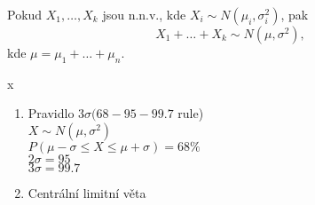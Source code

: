 \documentclass[../main.tex]{subfiles}
\begin{document}
\begin{remark}
    Pokud $X_1,\dots,X_k$ jsou n.n.v., kde $X_i \sim N(\mu_i, \sigma^2_i)$, pak
    \[X_1 + \dots + X_k \sim N(\mu, \sigma^2),\]
    kde $\mu = \mu_1 + \hdots + \mu_n$.
\end{remark}

\begin{remark}
    {\color{white} x}

    \begin{enumerate}
        \item Pravidlo $3\sigma (68-95-99.7$ rule)\\
        $X \sim N(\mu, \sigma^2)$\\
        $P(\mu-\sigma \leq X \leq \mu + \sigma) = 68 \%$\\
        $2\sigma = 95$\\
        $3\sigma = 99.7$
        
        \item Centrální limitní věta
    \end{enumerate}
\end{remark}
\end{document}
